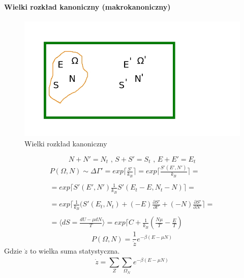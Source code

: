 \documentclass{article}
\begin{document}
		\paragraph{Wielki rozkład kanoniczny (makrokanoniczny)}
		\begin{figure}[ht]
			\label{fig:fig1}
			\centering
			\includegraphics[scale=0.5]{wielkikanoniczny.jpeg}
			\caption{Wielki rozkład kanoniczny}
		\end{figure}
		\begin{equation}
		N + N' = N_t \text{ , } S + S' = S_t \text{ , } E + E' = E_t
		\end{equation}
		\begin{equation}
		\begin{array}{cc}
			P(\Omega, N) \sim \Delta \Gamma' = exp\lceil \frac{S'}{k_B} \rceil = 
			exp\lceil \frac{S'(E',N')}{k_B} \rceil= \\ \\
			 = exp\lceil {S'(E',N')}\frac{1}{k_B} {S'(E_t - E,N_t - N)} \rceil= \\ \\ 
			 = exp\lceil \frac{1}{k_B}(S'(E_t, N_t) + (-E)\frac{\partial S'}{\partial t'} + 
			 (-N)\frac{\partial S'}{\partial N'} \rceil = \\ \\
			 = \langle dS = \frac{dU - \mu dN}{T} \rangle = 
			 exp \lceil C + \frac{1}{k_B} (\frac{N\mu}{T} - \frac{E}{T})
		\end{array}
		\end{equation}
		\begin{equation}
		P(\Omega, N) = \frac{1}{\dot{z}} e^{-\beta (E - \mu N)}
		\end{equation}
		Gdzie $ \dot{z} $ to wielka suma statystyczna.
		\begin{equation}
		\dot{z} = \sum_{Z}^{}\sum_{\Omega_N}^{}e^{-\beta (E - \mu N)}
		\end{equation}
\end{document}
